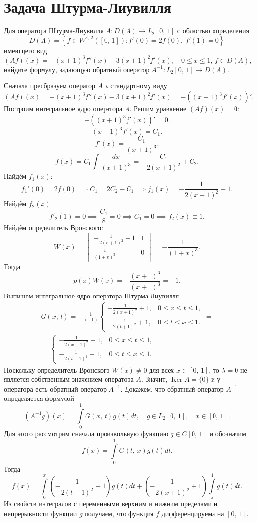 \documentclass[a4paper]{article}
\begin{document}
\section{Задача Штурма-Лиувилля}
\begin{hiProb}[№11]
	Для оператора Штурма-Лиувилля $A\colon D(A)\to L_2[0,\,1]$ с областью определения
	\[
		D(A)= \left\{ f \in W^{2,\,2}\left( [0,\,1] \right) \colon f'(0)=2f(0),\ f'(1)=0 \right\} 
	\]
имеющего вид
\[
	(Af)(x)=- (x+1)^3f''(x)-3(x+1)^2f'(x),\quad
	0\le x\le 1,\ f \in D(A),
\]
найдите формулу, задающую обратный оператор $A^{-1}\colon 
L_2[0,\,1]\to D(A)$.
\end{hiProb}
\begin{sol}
Сначала преобразуем оператор $A$ к стандартному виду
\[
	(Af)(x)=-(x+1)^3 f''(x)-3(x+1)^2f'(x)=
	-\left( (x+1)^3 f'(x) \right) '
.\] 
Построим интегральное ядро оператора $A$. Решим уравнение $
(Af)(x)=0$:
\[
	-\left( (x+1)^3f'(x) \right) '=0
.\] 
\[
	(x+1)^3 f'(x)=C_1
.\] 
\[
	f'(x)=\frac{C_1}{(x+1)^3}
.\] 
\[
	f(x)= C_1 \int \frac{dx}{(x+1)^3}=-\frac{C_1}{2(x+1)^2}
	+C_2
.\] 
Найдём $f_1(x)$:
\[
	f_1'(0)=2f(0)\implies
	C_1=2C_2-C_1\implies f_1(x)=-\frac{1}{2(x+1)^2}+1
.\] 
Найдём $f_2(x)$
\[
	f'_2(1)=0 \implies \frac{C_1}{8}=0 \implies C_1=0
	\implies f_2(x)\equiv 1
.\]
Найдём определитель Вронского:
\[
	W(x)= \begin{vmatrix} - \frac{1}{2(x+1)^2}+1 & 1\\
		\frac{1}{(1+x)^3}& 0
	\end{vmatrix} 
	=-\frac{1}{(1+x)^3}
.\] 
Тогда
\[p(x)W(x)= -\frac{(x+1)^3}{(x+1)^3}=-1.\]
Выпишем интегральное ядро оператора Штурма-Лиувилля
\begin{multline*}
	G(x,\,t)=-\frac{1}{(-1)} \begin{cases}
		-\frac{1}{2(x+1)^2}+1,& 0\le x\le t\le 1,\\
		-\frac{1}{2(t+1)^2}+1,& 0\le t\le x\le 1.
	\end{cases}=\\=
	\begin{cases}
		-\frac{1}{2(x+1)^2}+1,& 0\le x\le t\le 1,\\
		-\frac{1}{2(t+1)^2}+1,& 0\le t\le x\le 1.
	\end{cases}
\end{multline*} 
Поскольку определитель Вронского $W(x)\neq 0$ для всех $x \in 
 \left[ 0,\,1 \right] $, то $\lambda=0$ не является собственным
 значением оператора $A$.
Значит, $\operatorname{Ker} A= \{0\} $ и у оператора есть
обратный оператор $A^{-1}$. Докажем, что обратный оператор
$A^{-1}$ определяется формулой
\[
	(A^{-1}g)(x)= \int\limits_{0}^{1} G(x,\,t)g(t)dt,\quad
	g \in L_2 \left[ 0,\,1 \right] ,\quad
	x \in [0,\,1]
.\] 
Для этого рассмотрим сначала произвольную функцию $g \in C[0,\,1]$ и обозначим
\[
	f(x)= \int\limits_{0}^{1} G(t,\,x)g(t)dt 
.\] 
Тогда
\[
	f(x)=\int\limits_{0}^{x} \left( -\frac{1}{2(t+1)^2}+1 \right) g(t)dt+\left( -\frac{1}{2(x+1)^2}+1 \right) \int\limits_{x}^{1}   g(t)dt
.\] 
Из свойств интегралов с переменными верхним и нижним пределами
и непрерывности функции $g$ получаем, что функция $f$ дифференцируема
на $[0,\,1]$.


\end{sol}
\end{document}
